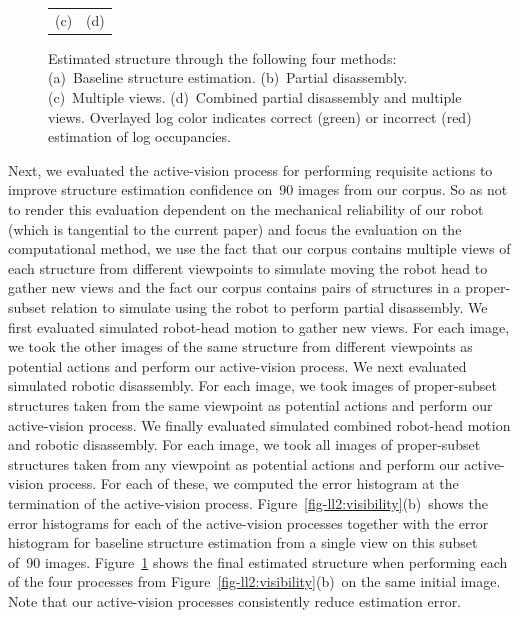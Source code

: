 \begin{figure}
\begin{tabular}{@{}c@{\hspace*{2pt}}c@{}}
    (c)&(d)
  \end{tabular}
  \caption{\small Estimated structure through the following four methods:
    (a)~Baseline structure estimation.
    (b)~Partial disassembly.
    (c)~Multiple views.
    (d)~Combined partial disassembly and multiple views.
    Overlayed log color indicates correct (green) or incorrect (red)
    estimation of log occupancies.}
  \label{fig-ll2:results}
  \par\vspace*{-3ex}
\end{figure}

Next, we evaluated the active-vision process for performing requisite actions
to improve structure estimation confidence on~90 images from our corpus.
%
So as not to render this evaluation dependent on the mechanical reliability of
our robot (which is tangential to the current paper) and focus the evaluation on
the computational method, we use the fact that our corpus contains multiple
views of each structure from different viewpoints to simulate moving the robot
head to gather new views and the fact our corpus contains pairs of structures
in a proper-subset relation to simulate using the robot to perform partial
disassembly.
%
We first evaluated simulated robot-head motion to gather new views.
%
For each image, we took the other images of the same structure from different
viewpoints as potential actions and perform our active-vision process.
%
We next evaluated simulated robotic disassembly.
%
For each image, we took images of proper-subset structures taken from the same
viewpoint as potential actions and perform our active-vision process.
%
We finally evaluated simulated combined robot-head motion and robotic
disassembly.
%
For each image, we took all images of proper-subset structures taken from any
viewpoint as potential actions and perform our active-vision process.
%
For each of these, we computed the error histogram at the termination of the
active-vision process.
%
Figure~\ref{fig-ll2:visibility}(b)~shows the error histograms for each of the
active-vision processes together with the error histogram for baseline
structure estimation from a single view on this subset of~90 images.
%
Figure~\ref{fig-ll2:results} shows the final estimated structure when performing
each of the four processes from Figure~\ref{fig-ll2:visibility}(b)~on the same
initial image.
%
Note that our active-vision processes consistently reduce estimation error.

